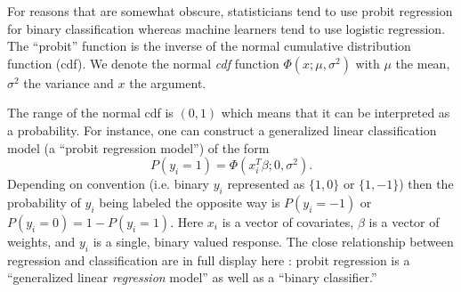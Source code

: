 
%
%




%
%
For reasons that are somewhat obscure, statisticians tend to use probit regression for binary classification whereas machine learners tend to use logistic regression.
 The ``probit'' function is the inverse of the normal cumulative distribution function (cdf).    We denote the normal {\em cdf} function $\Phi(x;\mu,\sigma^2)$ with $\mu$ the mean, $\sigma^2$ the variance and $x$ the argument.

The range of the normal cdf is $(0,1)$ which means that it can be interpreted as a probability.  For instance, one can construct a generalized linear classification model (a ``probit regression model'') of the form 
\begin{equation}
P(y_i = 1) = \Phi(x_i^T\beta; 0, \sigma^2). \label{eqn:probit}
\end{equation}  Depending on convention (i.e. binary $y_i$ represented as $\{1,0\}$ or $\{1,-1\}$) then the probability of $y_i$ being labeled the opposite way is $P(y_i = -1)$ or $P(y_i = 0) = 1 - P(y_i=1).$  Here $x_i$ is a vector of covariates, $\beta$ is a vector of weights, and $y_i$ is a single, binary valued response.  The close relationship between regression and classification are in full display here : probit regression is a ``generalized linear {\em regression} model'' as well as a ``binary classifier.''

